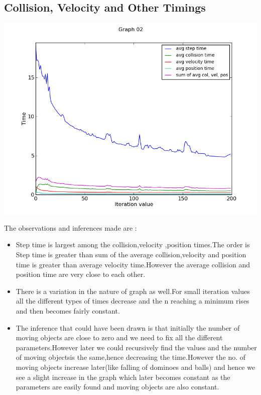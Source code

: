 \documentclass[11pt]{article}
\begin{document}
\subsection{Collision, Velocity and  Other Timings} 
\begin{center}
  \includegraphics[scale=0.75]{g03_plot02.png}
\end{center}
The observations and inferences made are :
\begin{itemize}
\item Step time is largest among the collision,velocity ,position times.The order is Step time is greater than sum of the average collision,velocity and position time is greater than average velocity time.However the average collision and position time are very close to each other.
\item There is a variation in the nature of graph as well.For small iteration values all the different types of times decrease and the n reaching a minimum rises and then becomes fairly constant.
\item The inference that could have been drawn is that initially the number of moving objects are close to zero and we need to fix all the different parameters.However later we could recursively find the values and the number of moving objectsis the same,hence decreasing the time.However the no. of moving objects increase later(like falling of dominoes and balls)  and hence we see a slight increase in the graph which later becomes constant as the parameters are easily found and moving objects are also constant. 
\end{itemize}
\end{document}
